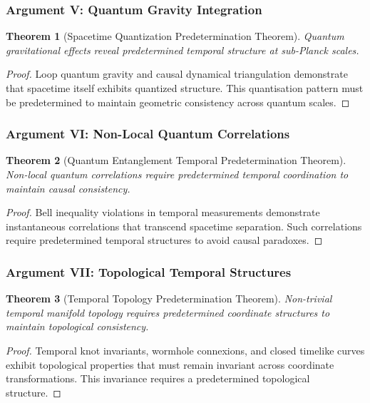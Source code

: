 \documentclass[12pt,a4paper]{article}
\newtheorem{theorem}{Theorem}[section]
\begin{document}
\subsubsection{Argument V: Quantum Gravity Integration}

\begin{theorem}[Spacetime Quantization Predetermination Theorem]
Quantum gravitational effects reveal predetermined temporal structure at sub-Planck scales.
\end{theorem}

\begin{proof}
Loop quantum gravity and causal dynamical triangulation demonstrate that spacetime itself exhibits quantized structure. This quantisation pattern must be predetermined to maintain geometric consistency across quantum scales.
\end{proof}

\subsubsection{Argument VI: Non-Local Quantum Correlations}

\begin{theorem}[Quantum Entanglement Temporal Predetermination Theorem]
Non-local quantum correlations require predetermined temporal coordination to maintain causal consistency.
\end{theorem}

\begin{proof}
Bell inequality violations in temporal measurements demonstrate instantaneous correlations that transcend spacetime separation. Such correlations require predetermined temporal structures to avoid causal paradoxes.
\end{proof}

\subsubsection{Argument VII: Topological Temporal Structures}

\begin{theorem}[Temporal Topology Predetermination Theorem]
Non-trivial temporal manifold topology requires predetermined coordinate structures to maintain topological consistency.
\end{theorem}

\begin{proof}
Temporal knot invariants, wormhole connexions, and closed timelike curves exhibit topological properties that must remain invariant across coordinate transformations. This invariance requires a predetermined topological structure.
\end{proof}
\end{document}
